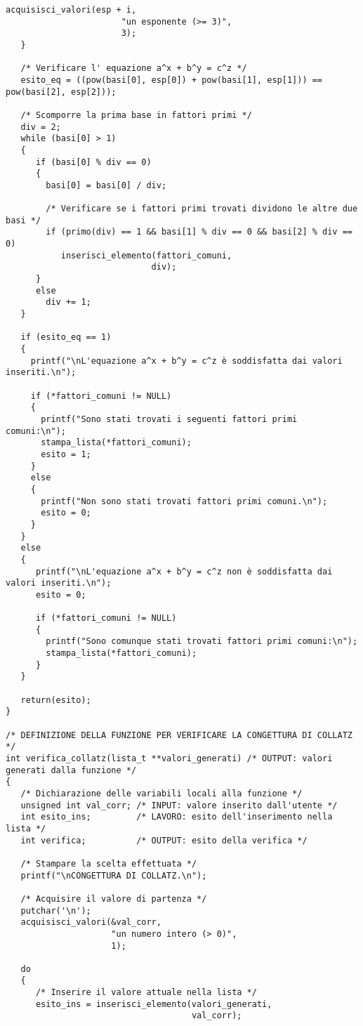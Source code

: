 \documentclass[10pt]{report}
\begin{document}
\begin{lstlisting}[label = {lst:codiceSorgente}]
   	 acquisisci_valori(esp + i, 
   	                   "un esponente (>= 3)", 
   	                   3);
   }

   /* Verificare l' equazione a^x + b^y = c^z */
   esito_eq = ((pow(basi[0], esp[0]) + pow(basi[1], esp[1])) == pow(basi[2], esp[2]));
   
   /* Scomporre la prima base in fattori primi */
   div = 2;
   while (basi[0] > 1) 
   {   
   	  if (basi[0] % div == 0)
   	  {   
   	  	basi[0] = basi[0] / div;

        /* Verificare se i fattori primi trovati dividono le altre due basi */
   	  	if (primo(div) == 1 && basi[1] % div == 0 && basi[2] % div == 0)
   	  	   inserisci_elemento(fattori_comuni, 
   	  	                     div);
   	  }
   	  else
   	    div += 1;
   }
    
   if (esito_eq == 1)
   {
   	 printf("\nL'equazione a^x + b^y = c^z è soddisfatta dai valori inseriti.\n");

   	 if (*fattori_comuni != NULL)
     {  		
       printf("Sono stati trovati i seguenti fattori primi comuni:\n");
   	   stampa_lista(*fattori_comuni);
       esito = 1;
     }
     else
     {
       printf("Non sono stati trovati fattori primi comuni.\n");
       esito = 0;
     }
   }
   else 
   {   
	  printf("\nL'equazione a^x + b^y = c^z non è soddisfatta dai valori inseriti.\n");
   	  esito = 0;

   	  if (*fattori_comuni != NULL)
   	  {
   	    printf("Sono comunque stati trovati fattori primi comuni:\n");
   	    stampa_lista(*fattori_comuni);
   	  }
   }

   return(esito);	   
}

/* DEFINIZIONE DELLA FUNZIONE PER VERIFICARE LA CONGETTURA DI COLLATZ */
int verifica_collatz(lista_t **valori_generati) /* OUTPUT: valori generati dalla funzione */
{
   /* Dichiarazione delle variabili locali alla funzione */
   unsigned int val_corr; /* INPUT: valore inserito dall'utente */
   int esito_ins;         /* LAVORO: esito dell'inserimento nella lista */
   int verifica;          /* OUTPUT: esito della verifica */
   
   /* Stampare la scelta effettuata */
   printf("\nCONGETTURA DI COLLATZ.\n");

   /* Acquisire il valore di partenza */
   putchar('\n');
   acquisisci_valori(&val_corr, 
                     "un numero intero (> 0)", 
   				     1);
   
   do 
   {
      /* Inserire il valore attuale nella lista */
   	  esito_ins = inserisci_elemento(valori_generati, 
   	                                 val_corr);
         

\end{lstlisting}
\end{document}

